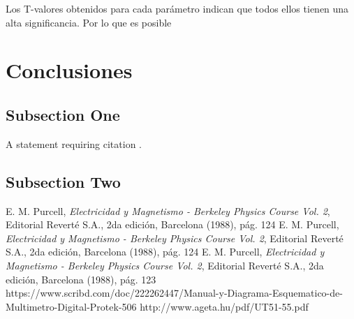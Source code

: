 \documentclass[twoside,twocolumn,a4paper]{article}
\begin{document}
Los T-valores obtenidos para cada par\'ametro indican que todos ellos tienen una alta significancia. Por lo que es posible  


\section{Conclusiones}

\subsection{Subsection One}

A statement requiring citation \cite{Figueredo:2009dg}.
\blindtext %

\subsection{Subsection Two}

\blindtext %


\begin{thebibliography}{99} %

 E. M. Purcell, \textit{Electricidad y Magnetismo - Berkeley Physics Course Vol. 2}, Editorial Revert\'e S.A., 2da edici\'on, Barcelona (1988), p\'ag. 124
 E. M. Purcell, \textit{Electricidad y Magnetismo - Berkeley Physics Course Vol. 2}, Editorial Revert\'e S.A., 2da edici\'on, Barcelona (1988), p\'ag. 124
 E. M. Purcell, \textit{Electricidad y Magnetismo - Berkeley Physics Course Vol. 2}, Editorial Revert\'e S.A., 2da edici\'on, Barcelona (1988), p\'ag. 123
 https://www.scribd.com/doc/222262447/Manual-y-Diagrama-Esquematico-de-Multimetro-Digital-Protek-506
 http://www.ageta.hu/pdf/UT51-55.pdf
 
\end{thebibliography}

\end{document}
